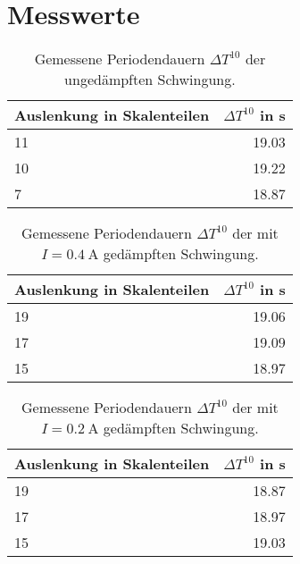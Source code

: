 \documentclass[
12pt,
a4paper,
bibliography=totocnumbered, %
BCOR=1cm, %
oneside, %
]{scrartcl}
\begin{document}
\section{Messwerte}

\begin{table}[H]
	\centering
	\caption{Gemessene Periodendauern \(\Delta T^{10}\) der ungedämpften Schwingung. \label{tbl:ungedämpft}}
	\begin{tabular}{lr}
		\toprule
		Auslenkung in Skalenteilen & \(\Delta T^{10}\) in \si{\second}\\
		\midrule
		11 & \num{19,03}\\
		10 & \num{19,22}\\
		7  & \num{18,87}\\
		\bottomrule
	\end{tabular}
\end{table}

\begin{table}[H]
	\centering
	\caption{Gemessene Periodendauern \(\Delta T^{10}\) der mit \(I = \qty{0,4}{\ampere}\) gedämpften Schwingung. \label{tbl:gedämpft400mA}}
	\begin{tabular}{lr}
		\toprule
		Auslenkung in Skalenteilen & \(\Delta T^{10}\) in \si{\second}\\
		\midrule
		19 & \num{19,06}\\
		17 & \num{19,09}\\
		15 & \num{18,97}\\
		\bottomrule
	\end{tabular}
\end{table}

\begin{table}[H]
	\centering
	\caption{Gemessene Periodendauern \(\Delta T^{10}\) der mit \(I = \qty{0,2}{\ampere}\) gedämpften Schwingung. \label{tbl:gedämpft200mA}}
	\begin{tabular}{lr}
		\toprule
		Auslenkung in Skalenteilen & \(\Delta T^{10}\) in \si{\second}\\
		\midrule
		19 & \num{18,87}\\
		17 & \num{18,97}\\
		15 & \num{19,03}\\
		\bottomrule
	\end{tabular}
\end{table}
\end{document}
